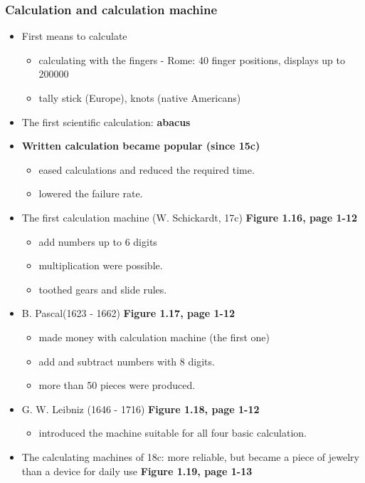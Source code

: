 \documentclass{standalone}
\begin{document}
\subsubsection*{Calculation and calculation machine}

\begin{itemize}
	\item First means to calculate
		\begin{itemize}
			\item calculating with the fingers - Rome: 40 finger positions, displays up to 200000
			\item tally stick (Europe), knots (native Americans)
		\end{itemize}
	\item The first scientific calculation: \textbf{abacus} 
	\item \textbf{Written calculation became popular (since 15c)}
		\begin{itemize}
			\item eased calculations and reduced the required time.
			\item lowered the failure rate.
		\end{itemize} 
	\item The first calculation machine (W. Schickardt, 17c) \textbf{Figure 1.16, page 1-12}
		\begin{itemize}
			\item add numbers up to 6 digits
			\item multiplication were possible. 
			\item toothed gears and slide rules. 
		\end{itemize}
	\item B. Pascal(1623 - 1662) \textbf{Figure 1.17, page 1-12}
		\begin{itemize}
			\item made money with calculation machine (the first one) 
			\item add and subtract numbers with 8 digits. 
			\item more than 50 pieces were produced. 
		\end{itemize}
	\item G. W. Leibniz (1646 - 1716) \textbf{Figure 1.18, page 1-12}
		\begin{itemize}
			\item introduced the machine suitable for all four basic calculation. 
		\end{itemize} 
	\item The calculating machines of 18c: more reliable, but became a piece of jewelry than a device for daily use \textbf{Figure 1.19, page 1-13}

\end{itemize}
\end{document}

